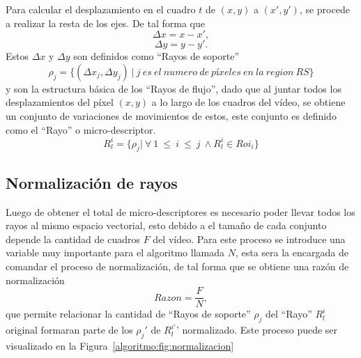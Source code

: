 	Para calcular el desplazamiento en el cuadro $t$ de $(x,y)$ a $(x',y')$, se procede a realizar la resta de los ejes. De tal forma que
	\begin{equation}
		\Delta x = x-x', 
	\end{equation}		
	\begin{equation}
		\Delta y = y-y'.
	\end{equation}		
	Estos $ \Delta x$ y $ \Delta y$ son definidos como ``Rayos de soporte''
	\begin{equation}
		\rho_j = \{(\Delta x_j, \Delta y_j)~|~j~es~el~numero~de~píxeles~en~la~region~RS \}
	\end{equation}		
	 y son la estructura básica de los ``Rayos de flujo'', dado que al juntar todos los desplazamientos del píxel $(x,y)$ a lo largo de los cuadros del vídeo, se obtiene un conjunto de variaciones de movimientos de estos, este conjunto es definido como el ``Rayo'' o micro-descriptor.
	\begin{equation}
		R^i_l	 = \{\rho_j | ~\forall ~1~\leq~i~\le~j\ \wedge R^i_l \in Roi_i \}
	\end{equation}
		
		
	\subsection{Normalización de rayos}
	\label{algoritmo:normalizacion}
	Luego de obtener el total de micro-descriptores es necesario poder llevar todos los rayos al mismo espacio vectorial, esto debido a el tamaño de cada conjunto depende la cantidad de cuadros $F$ del vídeo. Para este proceso se introduce una variable muy importante para el algoritmo llamada $N$, esta sera la encargada de comandar el proceso de normalización, de tal forma que se obtiene una razón de normalización
	\begin{equation}
		Razon = \frac{F}{N},
	\end{equation}
	que permite relacionar la cantidad de ``Rayos de soporte'' $\rho_j$ del ``Rayo'' $R^i_l$ original formaran parte de los $\rho_j '$ de $R^{i'}_l$' normalizado. Este proceso puede ser visualizado en la Figura~\ref{algoritmo:fig:normalizacion}
	
